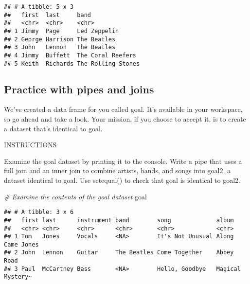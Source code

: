 \documentclass[]{article}
\newenvironment{Shaded}{\begin{snugshade}}{\end{snugshade}}
\newcommand{\KeywordTok}[1]{\textcolor[rgb]{0.13,0.29,0.53}{\textbf{#1}}}
\newcommand{\DataTypeTok}[1]{\textcolor[rgb]{0.13,0.29,0.53}{#1}}
\newcommand{\StringTok}[1]{\textcolor[rgb]{0.31,0.60,0.02}{#1}}
\newcommand{\CommentTok}[1]{\textcolor[rgb]{0.56,0.35,0.01}{\textit{#1}}}
\newcommand{\OperatorTok}[1]{\textcolor[rgb]{0.81,0.36,0.00}{\textbf{#1}}}
\newcommand{\NormalTok}[1]{#1}
\begin{document}
\begin{Shaded}
\end{Shaded}

\begin{verbatim}
## # A tibble: 5 x 3
##   first  last     band              
##   <chr>  <chr>    <chr>             
## 1 Jimmy  Page     Led Zeppelin      
## 2 George Harrison The Beatles       
## 3 John   Lennon   The Beatles       
## 4 Jimmy  Buffett  The Coral Reefers 
## 5 Keith  Richards The Rolling Stones
\end{verbatim}

\subsection{Practice with pipes and
joins}\label{practice-with-pipes-and-joins}

We've created a data frame for you called goal. It's available in your
workspace, so go ahead and take a look. Your mission, if you choose to
accept it, is to create a dataset that's identical to goal.

INSTRUCTIONS

Examine the goal dataset by printing it to the console. Write a pipe
that uses a full join and an inner join to combine artists, bands, and
songs into goal2, a dataset identical to goal. Use setequal() to check
that goal is identical to goal2.

\begin{Shaded}
\begin{Highlighting}[]
\CommentTok{# Examine the contents of the goal dataset}
\NormalTok{goal}
\end{Highlighting}
\end{Shaded}

\begin{verbatim}
## # A tibble: 3 x 6
##   first last      instrument band        song             album           
##   <chr> <chr>     <chr>      <chr>       <chr>            <chr>           
## 1 Tom   Jones     Vocals     <NA>        It's Not Unusual Along Came Jones
## 2 John  Lennon    Guitar     The Beatles Come Together    Abbey Road      
## 3 Paul  McCartney Bass       <NA>        Hello, Goodbye   Magical Mystery~
\end{verbatim}
\end{document}
